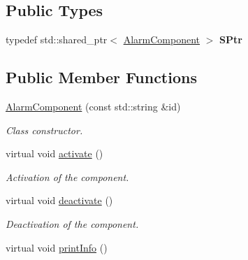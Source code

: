 \subsection*{Public Types}
\begin{DoxyCompactItemize}
\item 
typedef std\+::shared\+\_\+ptr$<$ \hyperlink{classAlarmComponent}{Alarm\+Component} $>$ {\bfseries S\+Ptr}\hypertarget{classAlarmComponent_a508e811a15269806af1a18aa4d387128}{}\label{classAlarmComponent_a508e811a15269806af1a18aa4d387128}

\end{DoxyCompactItemize}
\subsection*{Public Member Functions}
\begin{DoxyCompactItemize}
\item 
\hyperlink{classAlarmComponent_a7e726c4fb79d226772182fe979967028}{Alarm\+Component} (const std\+::string \&id)
\begin{DoxyCompactList}\small\item\em Class constructor. \end{DoxyCompactList}\item 
virtual void \hyperlink{classAlarmComponent_ab2acf6b580efe04bd617580ecb7323f1}{activate} ()\hypertarget{classAlarmComponent_ab2acf6b580efe04bd617580ecb7323f1}{}\label{classAlarmComponent_ab2acf6b580efe04bd617580ecb7323f1}

\begin{DoxyCompactList}\small\item\em Activation of the component. \end{DoxyCompactList}\item 
virtual void \hyperlink{classAlarmComponent_aef44069a068e92ccd15b3afcbd06dff6}{deactivate} ()\hypertarget{classAlarmComponent_aef44069a068e92ccd15b3afcbd06dff6}{}\label{classAlarmComponent_aef44069a068e92ccd15b3afcbd06dff6}

\begin{DoxyCompactList}\small\item\em Deactivation of the component. \end{DoxyCompactList}\item 
virtual void \hyperlink{classAlarmComponent_a51a7a6e0d85da344c741deddfcb7cff3}{print\+Info} ()\hypertarget{classAlarmComponent_a51a7a6e0d85da344c741deddfcb7cff3}{}\label{classAlarmComponent_a51a7a6e0d85da344c741deddfcb7cff3}


\end{DoxyCompactItemize}
